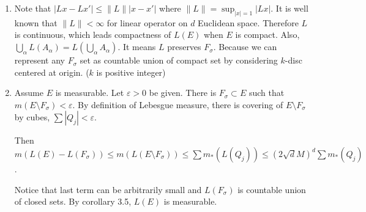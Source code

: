\begin{problem}[1.8] \hfill
	\begin{enumerate}[label = (\alph*)]
		\item Note that $\left | Lx - Lx' \right | \leq \| L \| |x-x'|$ where $\| L \| = \sup_{|x| = 1} \left |Lx \right |$. It is well known that $\| L \| < \infty$ for linear operator on $d$ Euclidean space. Therefore $L$ is continuous, which leads compactness of $L(E)$ when $E$ is compact. Also, $\bigcup_\alpha L(A_\alpha) = L(\bigcup_\alpha A_\alpha)$. It means $L$ preserves $F_\sigma$. Because we can represent any $F_\sigma$ set as countable union of compact set by considering $k$-disc centered at origin. ($k$ is positive integer)

		\item Assume $E$ is measurable. Let $\varepsilon >0$ be given. There is $F_\sigma \subset E$ such that $m\left( E \setminus F_\sigma \right) < \varepsilon$. By definition of Lebesgue measure, there is covering of $E \setminus F_\sigma$ by cubes, $\sum |Q_j| < \varepsilon$. 
			
			Then $m\left( L(E) - L(F_\sigma) \right) \leq m\left( L\left( E \setminus F_\sigma \right) \right) \leq \sum m_{*}\left( L(Q_j )\right) \leq (2 \sqrt{d} M)^d \sum m_{*}(Q_j)$.

			Notice that last term can be arbitrarily small and $L(F_\sigma)$ is countable union of closed sets. By corollary 3.5, $L(E)$ is measurable.
	\end{enumerate}
	
\end{problem}

